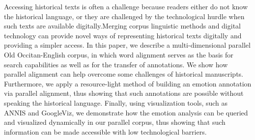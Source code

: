 Accessing historical texts is often a challenge because readers either do not know the historical language, or they are challenged by the technological hurdle when such texts are available digitally.Merging corpus linguistic methods and digital technology can provide novel ways of representing historical texts digitally and providing a simpler access. In this paper, we describe a multi-dimensional parallel Old Occitan-English corpus, in which word alignment serves as the basis for search capabilities as well as for the transfer of annotations.  We show how parallel alignment can help overcome some challenges of historical manuscripts. Furthermore, we apply a resource-light method of building an emotion annotation via parallel alignment, thus showing that such annotations are possible without speaking the historical language. Finally, using visualization tools, such as ANNIS and GoogleViz, we demonstrate how the emotion analysis can be queried and visualized dynamically in our parallel corpus, thus showing that such information can be made accessible with low technological barriers.
